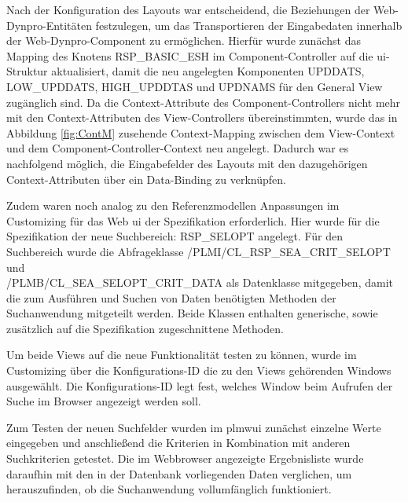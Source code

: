 Nach der Konfiguration des Layouts war entscheidend, die Beziehungen der Web-Dynpro-Entitäten festzulegen, um das Transportieren der Eingabedaten innerhalb der Web-Dynpro-Component zu ermöglichen. Hierfür wurde zunächst das Mapping des Knotens RSP\_BASIC\_ESH im Component-Controller auf die \ac{ui}-Struktur aktualisiert, damit die neu angelegten Komponenten UPDDATS, LOW\_UPDDATS,  HIGH\_UPDDTAS und UPDNAMS für den General View zugänglich sind. Da die Context-Attribute des Component-Controllers nicht mehr mit den Context-Attributen des View-Controllers übereinstimmten, wurde das in Abbildung \ref{fig:ContM} zusehende Context-Mapping zwischen dem View-Context und dem Component-Controller-Context neu angelegt. Dadurch war es nachfolgend möglich, die Eingabefelder des Layouts mit den dazugehörigen Context-Attributen über ein Data-Binding zu verknüpfen.

Zudem waren noch analog zu den Referenzmodellen Anpassungen im Customizing für das Web \ac{ui} der Spezifikation erforderlich. Hier wurde für die Spezifikation der neue Suchbereich: RSP\_SELOPT angelegt. Für den Suchbereich wurde die Abfrageklasse /PLMI/CL\_RSP\_SEA\_CRIT\_SELOPT und \\/PLMB/CL\_SEA\_SELOPT\_CRIT\_DATA als Datenklasse mitgegeben, damit die zum Ausführen und Suchen von Daten benötigten Methoden der Suchanwendung mitgeteilt werden. Beide Klassen enthalten generische, sowie zusätzlich auf die Spezifikation zugeschnittene Methoden.

Um beide Views auf die neue Funktionalität testen zu können, wurde im Customizing über die Konfigurations-ID die zu den Views gehörenden Windows ausgewählt. Die Konfigurations-ID legt fest, welches Window beim Aufrufen der Suche im Browser angezeigt werden soll.



Zum Testen der neuen Suchfelder wurden im \ac{plmwui} zunächst einzelne Werte eingegeben und anschließend die Kriterien in Kombination mit anderen Suchkriterien getestet. Die im Webbrowser angezeigte Ergebnisliste wurde daraufhin mit den in der Datenbank vorliegenden Daten verglichen, um herauszufinden, ob die Suchanwendung vollumfänglich funktioniert.

